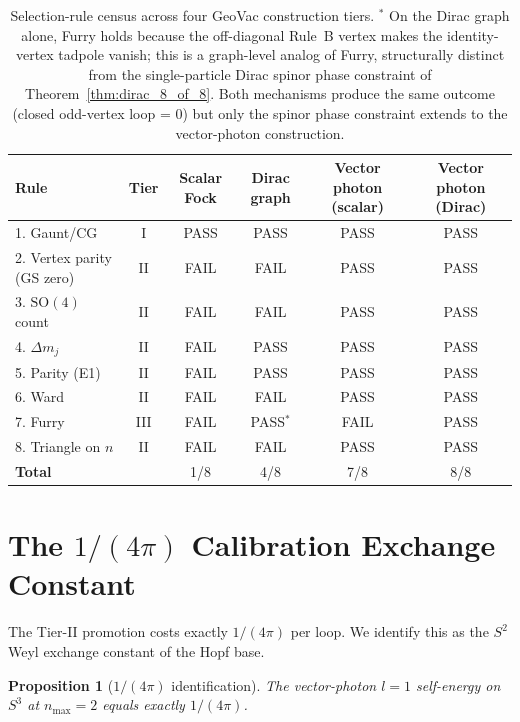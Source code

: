 \documentclass[11pt]{article}
\newtheorem{proposition}{Proposition}
\begin{document}
\begin{table}[h]
\centering
\small
\begin{tabular}{l c c c c c}
\toprule
Rule & Tier &
Scalar Fock & Dirac graph &
Vector photon (scalar) & Vector photon (Dirac) \\
\midrule
1. Gaunt/CG                 & I   & PASS & PASS & PASS & PASS \\
2. Vertex parity (GS zero)  & II  & FAIL & FAIL & PASS & PASS \\
3. $\mathrm{SO}(4)$ count   & II  & FAIL & FAIL & PASS & PASS \\
4. $\Delta m_j$             & II  & FAIL & PASS & PASS & PASS \\
5. Parity (E1)              & II  & FAIL & PASS & PASS & PASS \\
6. Ward                     & II  & FAIL & FAIL & PASS & PASS \\
7. Furry                    & III & FAIL & PASS\(^*\) & FAIL & PASS \\
8. Triangle on $n$          & II  & FAIL & FAIL & PASS & PASS \\
\midrule
\textbf{Total} & & 1/8 & 4/8 & 7/8 & 8/8 \\
\bottomrule
\end{tabular}
\caption{Selection-rule census across four GeoVac construction tiers.
\(^*\) On the Dirac graph alone, Furry holds because the off-diagonal
Rule~B vertex makes the identity-vertex tadpole vanish; this is a
graph-level analog of Furry, structurally distinct from the
single-particle Dirac spinor phase constraint of
Theorem~\ref{thm:dirac_8_of_8}.  Both mechanisms produce the same
outcome (closed odd-vertex loop = 0) but only the spinor phase
constraint extends to the vector-photon construction.}
\label{tab:partition}
\end{table}

\section{The $1/(4\pi)$ Calibration Exchange Constant}
\label{sec:calibration}

The Tier-II promotion costs exactly $1/(4\pi)$ per loop.  We identify
this as the $S^2$ Weyl exchange constant of the Hopf base.

\begin{proposition}[$1/(4\pi)$ identification]
\label{prop:1_over_4pi}
The vector-photon $l = 1$ self-energy on $S^3$ at $n_{\max} = 2$
equals exactly $1/(4\pi)$.
\end{proposition}
\end{document}
